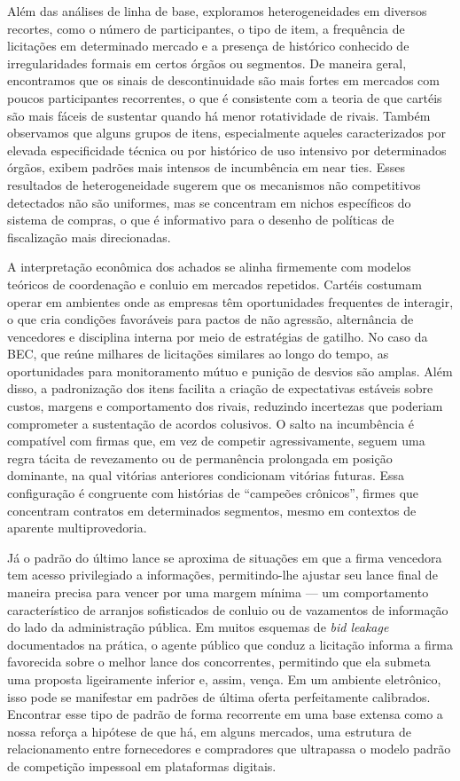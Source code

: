 \documentclass[12pt,a4paper]{article}
\begin{document}
Além das análises de linha de base, exploramos heterogeneidades em diversos recortes, como o número de participantes, o tipo de item, a frequência de licitações em determinado mercado e a presença de histórico conhecido de irregularidades formais em certos órgãos ou segmentos. De maneira geral, encontramos que os sinais de descontinuidade são mais fortes em mercados com poucos participantes recorrentes, o que é consistente com a teoria de que cartéis são mais fáceis de sustentar quando há menor rotatividade de rivais. Também observamos que alguns grupos de itens, especialmente aqueles caracterizados por elevada especificidade técnica ou por histórico de uso intensivo por determinados órgãos, exibem padrões mais intensos de incumbência em near ties. Esses resultados de heterogeneidade sugerem que os mecanismos não competitivos detectados não são uniformes, mas se concentram em nichos específicos do sistema de compras, o que é informativo para o desenho de políticas de fiscalização mais direcionadas.

A interpretação econômica dos achados se alinha firmemente com modelos teóricos de coordenação e conluio em mercados repetidos. Cartéis costumam operar em ambientes onde as empresas têm oportunidades frequentes de interagir, o que cria condições favoráveis para pactos de não agressão, alternância de vencedores e disciplina interna por meio de estratégias de gatilho. No caso da BEC, que reúne milhares de licitações similares ao longo do tempo, as oportunidades para monitoramento mútuo e punição de desvios são amplas. Além disso, a padronização dos itens facilita a criação de expectativas estáveis sobre custos, margens e comportamento dos rivais, reduzindo incertezas que poderiam comprometer a sustentação de acordos colusivos. O salto na incumbência é compatível com firmas que, em vez de competir agressivamente, seguem uma regra tácita de revezamento ou de permanência prolongada em posição dominante, na qual vitórias anteriores condicionam vitórias futuras. Essa configuração é congruente com histórias de ``campeões crônicos'', firmes que concentram contratos em determinados segmentos, mesmo em contextos de aparente multiprovedoria.

Já o padrão do último lance se aproxima de situações em que a firma vencedora tem acesso privilegiado a informações, permitindo-lhe ajustar seu lance final de maneira precisa para vencer por uma margem mínima — um comportamento característico de arranjos sofisticados de conluio ou de vazamentos de informação do lado da administração pública. Em muitos esquemas de \textit{bid leakage} documentados na prática, o agente público que conduz a licitação informa a firma favorecida sobre o melhor lance dos concorrentes, permitindo que ela submeta uma proposta ligeiramente inferior e, assim, vença. Em um ambiente eletrônico, isso pode se manifestar em padrões de última oferta perfeitamente calibrados. Encontrar esse tipo de padrão de forma recorrente em uma base extensa como a nossa reforça a hipótese de que há, em alguns mercados, uma estrutura de relacionamento entre fornecedores e compradores que ultrapassa o modelo padrão de competição impessoal em plataformas digitais.
\end{document}
